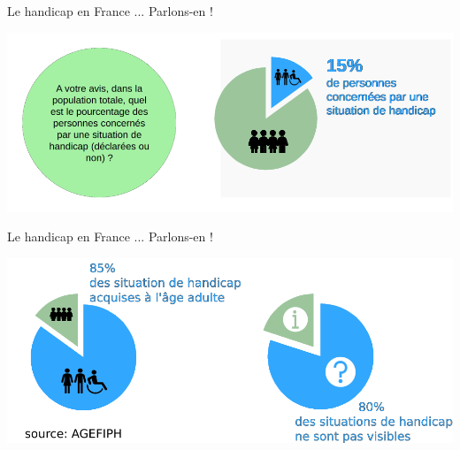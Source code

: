 \documentclass{beamer}
\begin{document}
\begin{frame}
 {Le handicap en France ... Parlons-en ! } 
 
 \includegraphics[width=1\linewidth]{images/handicap_cake1.png} 
 
\end{frame}


\begin{frame}
 {Le handicap en France ... Parlons-en ! } 
 
 \includegraphics[width=1\linewidth]{images/handicap_cake2.png} 
 
\end{frame}
\end{document}

